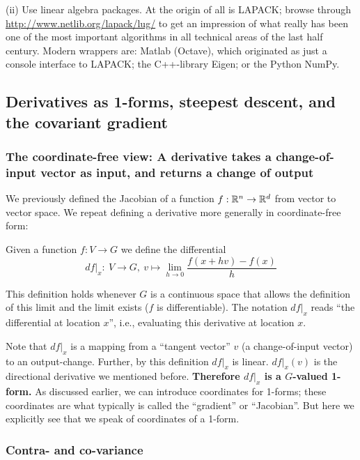 (ii) Use linear algebra packages. At the origin of all is LAPACK;
browse through \url{http://www.netlib.org/lapack/lug/} to get an
impression of what really has been one of the most important
algorithms in all technical areas of the last half century. Modern
wrappers are: Matlab (Octave), which originated as just a console
interface to LAPACK; the C++-library Eigen; or the Python NumPy.


\subsection{Derivatives as 1-forms, steepest descent, and the covariant gradient}

\subsubsection{The coordinate-free view: A
derivative takes a change-of-input vector as input, and returns a
change of output}

We previously defined the Jacobian of a function $f: {\mathbb{R}}^n \to {\mathbb{R}}^d$ from vector to vector space. We repeat defining a derivative more generally in
coordinate-free form:
\begin{myDefinition}
Given a function $f: V \to G$ we define the differential 
\begin{equation}
df\big|_x :~ V \to G,~ v \mapsto \lim_{h\to 0} \frac{f(x+hv) -
f(x)}{h}
\end{equation}
\end{myDefinition}
This definition holds whenever $G$ is a continuous
space that allows the definition of this limit and the limit exists
($f$ is differentiable). The notation $df|_x$ reads ``the differential
at location $x$'', i.e., evaluating this derivative at location $x$.

Note that $df|_x$ is a mapping from a ``tangent vector'' $v$ (a
change-of-input vector) to an output-change. Further, by this
definition $df|_x$ is linear. $df|_x(v)$ is the directional derivative we mentioned before. \textbf{Therefore $df|_x$ is a $G$-valued
1-form.} As discussed earlier, we can introduce coordinates for
1-forms; these coordinates are what typically is called the
``gradient'' or ``Jacobian''. But here we explicitly see that we speak
of coordinates of a 1-form.


\subsubsection{Contra- and co-variance}



